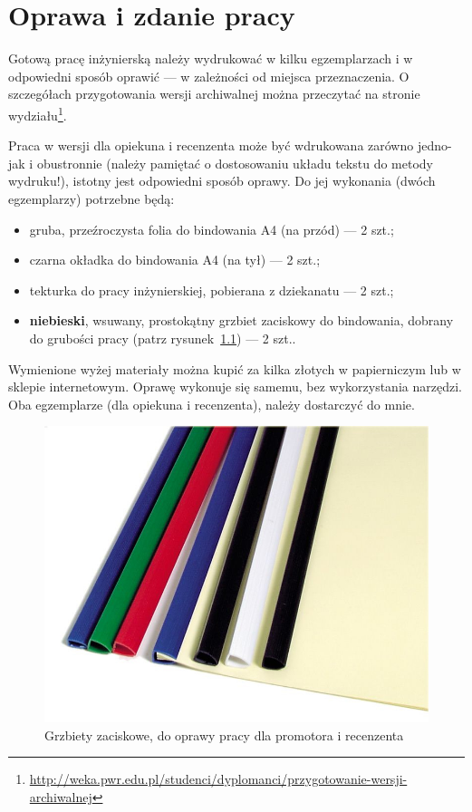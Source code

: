 \chapter{Oprawa i zdanie pracy}
\label{chap:printing}

Gotową pracę inżynierską należy wydrukować w kilku egzemplarzach i w odpowiedni sposób oprawić --- w zależności od miejsca przeznaczenia. O szczegółach przygotowania wersji archiwalnej można przeczytać na stronie wydziału\footnote{\url{http://weka.pwr.edu.pl/studenci/dyplomanci/przygotowanie-wersji-archiwalnej}}. 

Praca w wersji dla opiekuna i recenzenta może być wdrukowana zarówno jedno- jak i obustronnie (należy pamiętać o dostosowaniu układu tekstu do metody wydruku!), istotny jest odpowiedni sposób oprawy. Do jej wykonania (dwóch egzemplarzy) potrzebne będą:
\begin{itemize}
    \item gruba, przeźroczysta folia do bindowania A4 (na przód) --- 2 szt.;
    \item czarna okładka do bindowania A4 (na tył) --- 2 szt.;
    \item tekturka do pracy inżynierskiej, pobierana z dziekanatu --- 2 szt.;
    \item \textbf{niebieski}, wsuwany, prostokątny grzbiet zaciskowy do bindowania, dobrany do grubości pracy (patrz rysunek~\ref{fig:grzbiet}) --- 2 szt..
\end{itemize}
Wymienione wyżej materiały można kupić za kilka złotych w papierniczym lub w sklepie internetowym. Oprawę wykonuje się samemu, bez wykorzystania narzędzi. Oba egzemplarze (dla opiekuna i recenzenta), należy dostarczyć do mnie.

\begin{figure}
    \centering
    \includegraphics[width=\textwidth]{img/grzbiet.jpg}
    \caption{Grzbiety zaciskowe, do oprawy pracy dla promotora i recenzenta}
    \label{fig:grzbiet}
\end{figure}